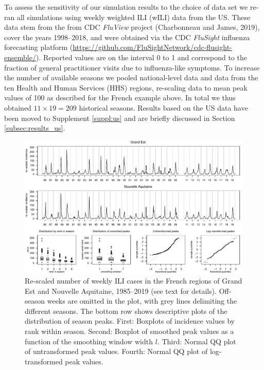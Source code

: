 \documentclass{article}
\begin{document}
To assess the sensitivity of our simulation results to the choice of data set we re-ran all simulations using  weekly weighted ILI (wILI) data from the US. These data stem from the from CDC \textit{FluView} project (Charbonneau and James, 2019), cover the years 1998–2018, and were
obtained via the CDC \textit{FluSight} influenza forecasting platform (\url{https://github.com/FluSightNetwork/cdc-flusight-ensemble/}). Reported values are on the interval 0 to 1 and correspond to the fraction of general practitioner visits due to influenza-like symptoms. To increase the number of available seasons we pooled national-level data and data from the ten Health and Human Services (HHS) regions, re-scaling data to mean peak values of 100 as described for the French example above. In total we thus obtained $11 \times 19 = 209$ historical seasons. Results based on the US data have been moved to Supplement \ref{suppl:us} and are briefly discussed in Section \ref{subsec:results_us}.


\begin{figure}[h]
\center
\includegraphics[width=1\textwidth]{figure/plot_data_fr.pdf}
\caption{Re-scaled number of weekly ILI cases in the French regions of Grand Est and Nouvelle Aquitaine, 1985--2019 (see text for details). Off-season weeks are omitted in the plot, with grey lines delimiting the different seasons. The bottom row shows descriptive plots of the distribution of season peaks. First: Boxplots of incidence values by rank within season. Second: Boxplot of smoothed peak values as a function of the smoothing window width $l$. Third: Normal QQ plot of untransformed peak values. Fourth: Normal QQ plot of log-transformed peak values.}
\label{fig:data}
\end{figure}
\end{document}
